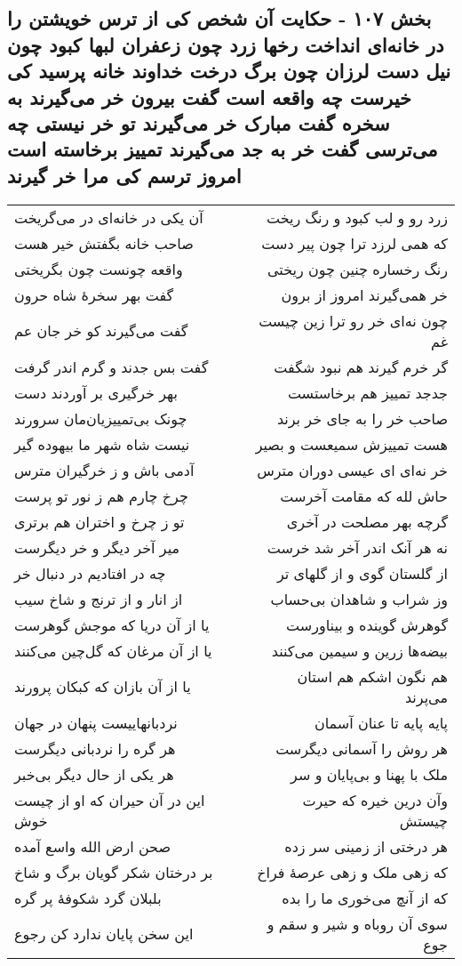 \begin{center}
\section*{بخش ۱۰۷ - حکایت آن شخص کی از ترس خویشتن را در خانه‌ای انداخت رخها زرد چون زعفران لبها کبود چون نیل دست لرزان چون برگ درخت خداوند خانه پرسید کی خیرست چه واقعه است گفت بیرون خر می‌گیرند به سخره گفت مبارک خر می‌گیرند تو خر نیستی چه می‌ترسی گفت خر به جد می‌گیرند تمییز برخاسته است امروز ترسم کی مرا خر گیرند}
\label{sec:sh107}
\begin{longtable}{l p{0.5cm} r}
آن یکی در خانه‌ای در می‌گریخت
&&
زرد رو و لب کبود و رنگ ریخت
\\
صاحب خانه بگفتش خیر هست
&&
که همی لرزد ترا چون پیر دست
\\
واقعه چونست چون بگریختی
&&
رنگ رخساره چنین چون ریختی
\\
گفت بهر سخرهٔ شاه حرون
&&
خر همی‌گیرند امروز از برون
\\
گفت می‌گیرند کو خر جان عم
&&
چون نه‌ای خر رو ترا زین چیست غم
\\
گفت بس جدند و گرم اندر گرفت
&&
گر خرم گیرند هم نبود شگفت
\\
بهر خرگیری بر آوردند دست
&&
جدجد تمییز هم برخاستست
\\
چونک بی‌تمییزیان‌مان سرورند
&&
صاحب خر را به جای خر برند
\\
نیست شاه شهر ما بیهوده گیر
&&
هست تمییزش سمیعست و بصیر
\\
آدمی باش و ز خرگیران مترس
&&
خر نه‌ای ای عیسی دوران مترس
\\
چرخ چارم هم ز نور تو پرست
&&
حاش لله که مقامت آخرست
\\
تو ز چرخ و اختران هم برتری
&&
گرچه بهر مصلحت در آخری
\\
میر آخر دیگر و خر دیگرست
&&
نه هر آنک اندر آخر شد خرست
\\
چه در افتادیم در دنبال خر
&&
از گلستان گوی و از گلهای تر
\\
از انار و از ترنج و شاخ سیب
&&
وز شراب و شاهدان بی‌حساب
\\
یا از آن دریا که موجش گوهرست
&&
گوهرش گوینده و بیناورست
\\
یا از آن مرغان که گل‌چین می‌کنند
&&
بیضه‌ها زرین و سیمین می‌کنند
\\
یا از آن بازان که کبکان پرورند
&&
هم نگون اشکم هم استان می‌پرند
\\
نردبانهاییست پنهان در جهان
&&
پایه پایه تا عنان آسمان
\\
هر گره را نردبانی دیگرست
&&
هر روش را آسمانی دیگرست
\\
هر یکی از حال دیگر بی‌خبر
&&
ملک با پهنا و بی‌پایان و سر
\\
این در آن حیران که او از چیست خوش
&&
وآن درین خیره که حیرت چیستش
\\
صحن ارض الله واسع آمده
&&
هر درختی از زمینی سر زده
\\
بر درختان شکر گویان برگ و شاخ
&&
که زهی ملک و زهی عرصهٔ فراخ
\\
بلبلان گرد شکوفهٔ پر گره
&&
که از آنچ می‌خوری ما را بده
\\
این سخن پایان ندارد کن رجوع
&&
سوی آن روباه و شیر و سقم و جوع
\\
\end{longtable}
\end{center}
